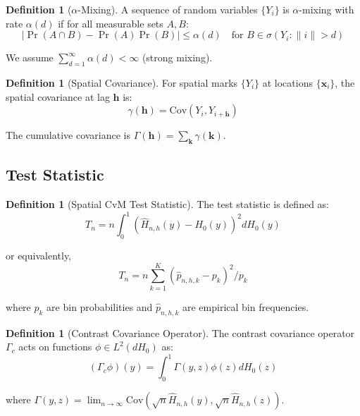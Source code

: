 \documentclass[12pt]{article}
\theoremstyle{plain}
\theoremstyle{definition}
\newtheorem{definition}[theorem]{Definition}
\newcommand{\abs}[1]{\left\lvert #1 \right\rvert}
\newcommand{\Cov}[1]{\mathrm{Cov}(#1)}
\newcommand{\1}[1]{\mathbf{1}_{#1}}
\begin{document}
\begin{definition}[$\alpha$-Mixing]
A sequence of random variables $\{Y_i\}$ is $\alpha$-mixing with rate $\alpha(d)$ if for all measurable sets $A, B$:
\begin{equation}
\abs{\Pr(A \cap B) - \Pr(A)\Pr(B)} \le \alpha(d) \quad \text{for } B \in \sigma(Y_i : \|i\| > d)
\end{equation}

We assume $\sum_{d=1}^\infty \alpha(d) < \infty$ (strong mixing).
\end{definition}

\begin{definition}[Spatial Covariance]
For spatial marks $\{Y_i\}$ at locations $\{\mathbf{x}_i\}$, the spatial covariance at lag $\mathbf{h}$ is:
\begin{equation}
\gamma(\mathbf{h}) = \Cov{Y_i, Y_{i+\mathbf{h}}}
\end{equation}

The cumulative covariance is $\Gamma(\mathbf{h}) = \sum_{\mathbf{k}} \gamma(\mathbf{k})$.
\end{definition}

\subsection{Test Statistic}

\begin{definition}[Spatial CvM Test Statistic]
The test statistic is defined as:
\begin{equation}
T_n = n \int_0^1 \left(\widehat{H}_{n,h}(y) - H_0(y)\right)^2 dH_0(y)
\end{equation}

or equivalently,
\begin{equation}
T_n = n \sum_{k=1}^K \left(\widehat{p}_{n,h,k} - p_k\right)^2 / p_k
\end{equation}

where $p_k$ are bin probabilities and $\widehat{p}_{n,h,k}$ are empirical bin frequencies.
\end{definition}

\begin{definition}[Contrast Covariance Operator]
The contrast covariance operator $\Gamma_c$ acts on functions $\phi \in L^2(dH_0)$ as:
\begin{equation}
(\Gamma_c \phi)(y) = \int_0^1 \Gamma(y,z) \phi(z) dH_0(z)
\end{equation}

where $\Gamma(y,z) = \lim_{n \to \infty} \Cov{\sqrt{n}\widehat{H}_{n,h}(y), \sqrt{n}\widehat{H}_{n,h}(z)}$.
\end{definition}
\end{document}

